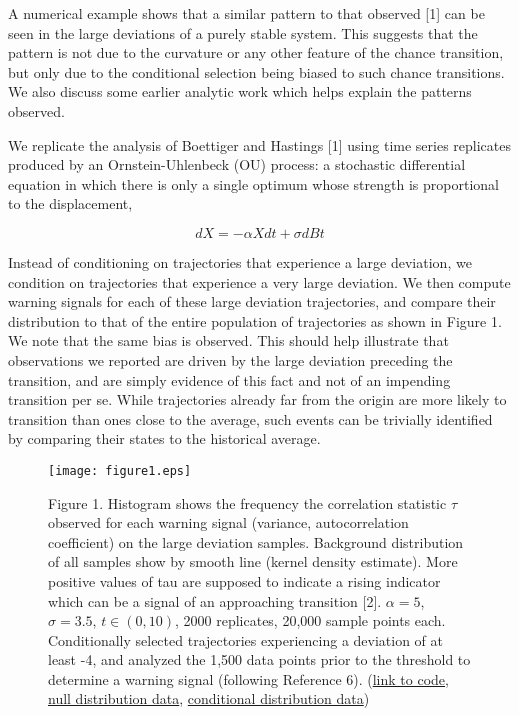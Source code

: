 \documentclass[review]{elsarticle} %
\begin{document}
A numerical example shows that a similar pattern to that observed
{[}1{]} can be seen in the large deviations of a purely stable system.
This suggests that the pattern is not due to the curvature or any other
feature of the chance transition, but only due to the conditional
selection being biased to such chance transitions. We also discuss some
earlier analytic work which helps explain the patterns observed.

We replicate the analysis of Boettiger and Hastings {[}1{]} using time
series replicates produced by an Ornstein-Uhlenbeck (OU) process: a
stochastic differential equation in which there is only a single optimum
whose strength is proportional to the displacement,

\[ dX = - \alpha X dt + \sigma dBt \]

Instead of conditioning on trajectories that experience a large
deviation, we condition on trajectories that experience a very large
deviation. We then compute warning signals for each of these large
deviation trajectories, and compare their distribution to that of the
entire population of trajectories as shown in Figure 1. We note that the
same bias is observed. This should help illustrate that observations we
reported are driven by the large deviation preceding the transition, and
are simply evidence of this fact and not of an impending transition per
se. While trajectories already far from the origin are more likely to
transition than ones close to the average, such events can be trivially
identified by comparing their states to the historical average.

\begin{figure}[htbp]
\centering
\texttt{[image: figure1.eps]}
\caption{Figure 1. Histogram shows the frequency the correlation
statistic $\tau$ observed for each warning signal (variance,
autocorrelation coefficient) on the large deviation samples. Background
distribution of all samples show by smooth line (kernel density
estimate). More positive values of tau are supposed to indicate a rising
indicator which can be a signal of an approaching transition {[}2{]}.
$\alpha = 5$, $\sigma=3.5$, $t \in (0, 10)$, 2000 replicates, 20,000
sample points each. Conditionally selected trajectories experiencing a
deviation of at least -4, and analyzed the 1,500 data points prior to
the threshold to determine a warning signal (following Reference 6).
(\href{https://raw.github.com/cboettig/earlywarning/7460ea94c293844d8e88c83b95e3d80004817de6/inst/examples/beer.md}{link to code},
\href{https://raw.github.com/cboettig/earlywarning/7460ea94c293844d8e88c83b95e3d80004817de6/inst/examples/beer_nulldat.csv}{null distribution data},
\href{https://raw.github.com/cboettig/earlywarning/7460ea94c293844d8e88c83b95e3d80004817de6/inst/examples/beer_dat.csv}{conditional distribution data})}
\end{figure}
\end{document}
